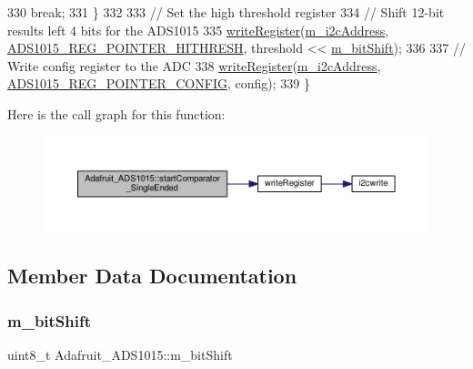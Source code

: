 \begin{DoxyCode}
330       \textcolor{keywordflow}{break};
331   \}
332 
333   \textcolor{comment}{// Set the high threshold register}
334   \textcolor{comment}{// Shift 12-bit results left 4 bits for the ADS1015}
335   \hyperlink{_cool_adafruit___a_d_s1015_8cpp_a00ef55774dfb93dd0a7bf561d8451b71}{writeRegister}(\hyperlink{class_adafruit___a_d_s1015_a2186993621a7973256d47f086c74035d}{m\_i2cAddress}, 
      \hyperlink{_cool_adafruit___a_d_s1015_8h_a89000549c6dfe50337c7962b7b3677cb}{ADS1015\_REG\_POINTER\_HITHRESH}, threshold << 
      \hyperlink{class_adafruit___a_d_s1015_ab238ce17112a78db2be4ea14d57fb114}{m\_bitShift});
336 
337   \textcolor{comment}{// Write config register to the ADC}
338   \hyperlink{_cool_adafruit___a_d_s1015_8cpp_a00ef55774dfb93dd0a7bf561d8451b71}{writeRegister}(\hyperlink{class_adafruit___a_d_s1015_a2186993621a7973256d47f086c74035d}{m\_i2cAddress}, 
      \hyperlink{_cool_adafruit___a_d_s1015_8h_ab9abb781632542a0e7d8b058292f26b1}{ADS1015\_REG\_POINTER\_CONFIG}, config);
339 \}
\end{DoxyCode}
Here is the call graph for this function\+:\nopagebreak
\begin{figure}[H]
\begin{center}
\leavevmode
\includegraphics[width=350pt]{df/df6/class_adafruit___a_d_s1015_aecd30775d943ea9d9cff0e3485926596_cgraph}
\end{center}
\end{figure}


\subsection{Member Data Documentation}
\mbox{\label{class_adafruit___a_d_s1015_ab238ce17112a78db2be4ea14d57fb114}} 
\subsubsection{\texorpdfstring{m\+\_\+bit\+Shift}{m\_bitShift}}
{\footnotesize\ttfamily uint8\+\_\+t Adafruit\+\_\+\+A\+D\+S1015\+::m\+\_\+bit\+Shift\hspace{0.3cm}{\ttfamily [protected]}}



